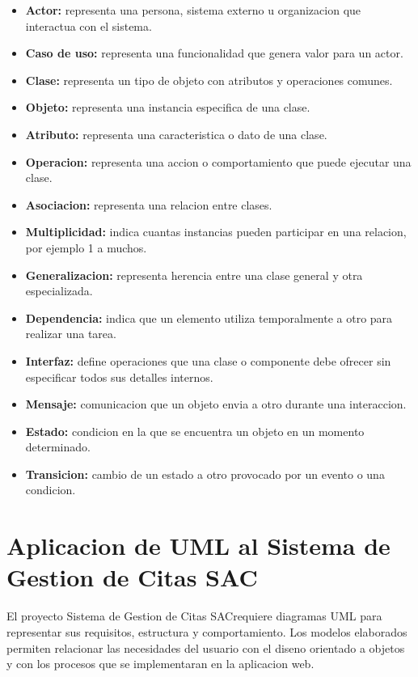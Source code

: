 \documentclass[12pt,letterpaper]{article}
\newcommand{\nombreProyecto}{Sistema de Gestion de Citas SAC}
\begin{document}
\begin{itemize}[leftmargin=1.2cm]
    \item \textbf{Actor:} representa una persona, sistema externo u organizacion que interactua con el sistema.
    \item \textbf{Caso de uso:} representa una funcionalidad que genera valor para un actor.
    \item \textbf{Clase:} representa un tipo de objeto con atributos y operaciones comunes.
    \item \textbf{Objeto:} representa una instancia especifica de una clase.
    \item \textbf{Atributo:} representa una caracteristica o dato de una clase.
    \item \textbf{Operacion:} representa una accion o comportamiento que puede ejecutar una clase.
    \item \textbf{Asociacion:} representa una relacion entre clases.
    \item \textbf{Multiplicidad:} indica cuantas instancias pueden participar en una relacion, por ejemplo 1 a muchos.
    \item \textbf{Generalizacion:} representa herencia entre una clase general y otra especializada.
    \item \textbf{Dependencia:} indica que un elemento utiliza temporalmente a otro para realizar una tarea.
    \item \textbf{Interfaz:} define operaciones que una clase o componente debe ofrecer sin especificar todos sus detalles internos.
    \item \textbf{Mensaje:} comunicacion que un objeto envia a otro durante una interaccion.
    \item \textbf{Estado:} condicion en la que se encuentra un objeto en un momento determinado.
    \item \textbf{Transicion:} cambio de un estado a otro provocado por un evento o una condicion.
\end{itemize}

\section{Aplicacion de UML al Sistema de Gestion de Citas SAC}

El proyecto \nombreProyecto requiere diagramas UML para representar sus requisitos, estructura y comportamiento. Los modelos elaborados permiten relacionar las necesidades del usuario con el diseno orientado a objetos y con los procesos que se implementaran en la aplicacion web.
\end{document}
